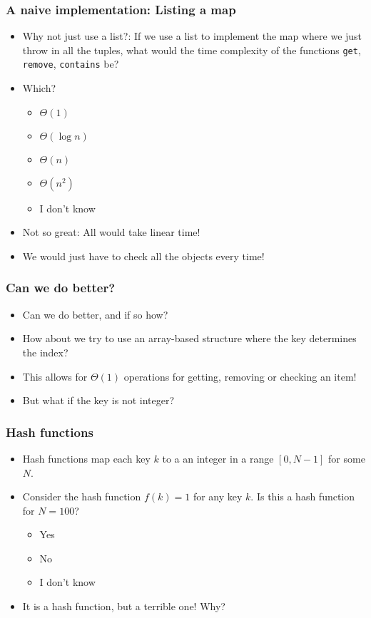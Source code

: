 \begin{frame}
	\frametitle{A naive implementation: Listing a map}

			\begin{itemize}
				\item Why not just use a list?: If we use a list to implement the map where we just throw in all the tuples, what would the time complexity
		of the functions \texttt{get}, \texttt{remove}, \texttt{contains} be?
						\item Which?
		\begin{itemize}
			\item $\Theta(1)$
			\item $\Theta(\log n)$
			\item $\Theta(n)$
			\item $\Theta(n^2)$
			\item I don't know
		\end{itemize}
		
				\item Not so great:		All would take linear time! 
 				\item We would just have to check all the objects every time!
	\end{itemize}
\end{frame}

\begin{frame}
	\frametitle{Can we do better?}
		\begin{itemize}
			\item Can we do better, and if so how?
			\item How about we try to use an array-based structure where the key determines the index?
			\item This allows for $\Theta(1)$ operations for getting, removing or checking an item!
			\item But what if the key is not integer?
	\end{itemize}
\end{frame}

\begin{frame}
	\frametitle{Hash functions}
	
		\begin{itemize}
			\item Hash functions map each key $k$ to a an integer in a range $[0, N-1]$ for some $N$.
			\item Consider the hash function $f(k) = 1$ for any key $k$.
			Is this a hash function for $N=100$?
			\begin{itemize}
				\item Yes
				\item No
				\item I don't know
			\end{itemize}
			\item It is a hash function, but a terrible one!
				Why?
		\end{itemize}	
\end{frame}

